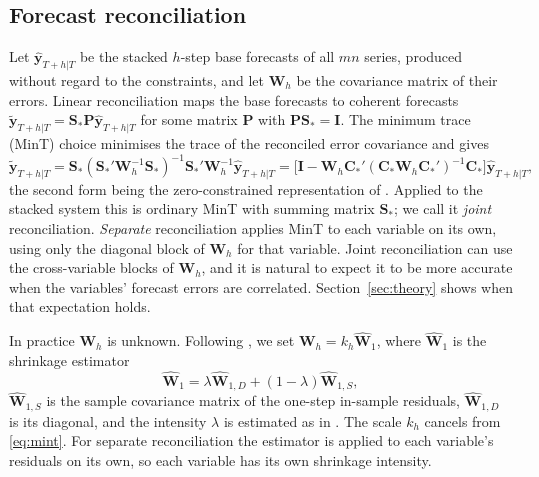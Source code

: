 \subsection{Forecast reconciliation}

Let $\widehat{\bm{y}}_{T+h|T}$ be the stacked $h$-step base forecasts of all $mn$ series, produced without regard to the constraints, and let $\bm{W}_h$ be the covariance matrix of their errors. Linear reconciliation maps the base forecasts to coherent forecasts $\widetilde{\bm{y}}_{T+h|T} = \bm{S}_*\bm{P}\widehat{\bm{y}}_{T+h|T}$ for some matrix $\bm{P}$ with $\bm{P}\bm{S}_* = \bm{I}$. The minimum trace (MinT) choice \citep{wickramasuriya2019optimal} minimises the trace of the reconciled error covariance and gives
\begin{equation}\label{eq:mint}
  \widetilde{\bm{y}}_{T+h|T} = \bm{S}_*(\bm{S}_*'\bm{W}_h^{-1}\bm{S}_*)^{-1}\bm{S}_*'\bm{W}_h^{-1}\widehat{\bm{y}}_{T+h|T}
  = \big[\bm{I} - \bm{W}_h\bm{C}_*'(\bm{C}_*\bm{W}_h\bm{C}_*')^{-1}\bm{C}_*\big]\widehat{\bm{y}}_{T+h|T},
\end{equation}
the second form being the zero-constrained representation of \citet{di2023cross}. Applied to the stacked system this is ordinary MinT with summing matrix $\bm{S}_*$; we call it \emph{joint} reconciliation. \emph{Separate} reconciliation applies MinT to each variable on its own, using only the diagonal block of $\bm{W}_h$ for that variable. Joint reconciliation can use the cross-variable blocks of $\bm{W}_h$, and it is natural to expect it to be more accurate when the variables' forecast errors are correlated. Section~\ref{sec:theory} shows when that expectation holds.

In practice $\bm{W}_h$ is unknown. Following \citet{wickramasuriya2019optimal}, we set $\bm{W}_h = k_h\widehat{\bm{W}}_1$, where $\widehat{\bm{W}}_1$ is the shrinkage estimator
\begin{equation}\label{eq:shrink}
  \widehat{\bm{W}}_1 = \lambda\widehat{\bm{W}}_{1,D} + (1 - \lambda)\widehat{\bm{W}}_{1,S},
\end{equation}
$\widehat{\bm{W}}_{1,S}$ is the sample covariance matrix of the one-step in-sample residuals, $\widehat{\bm{W}}_{1,D}$ is its diagonal, and the intensity $\lambda$ is estimated as in \citet{schafer2005shrinkage}. The scale $k_h$ cancels from \eqref{eq:mint}. For separate reconciliation the estimator is applied to each variable's residuals on its own, so each variable has its own shrinkage intensity.
